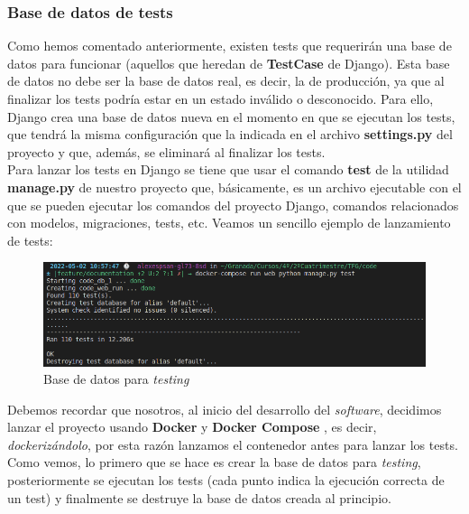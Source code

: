 \subsubsection{Base de datos de tests}
Como hemos comentado anteriormente, existen tests que requerirán una base de datos para
funcionar (aquellos que heredan de \textbf{TestCase} de Django). Esta base de datos no debe
ser la base de datos real, es decir, la de producción, ya que al finalizar los tests podría
estar en un estado inválido o desconocido. Para ello, Django crea una base de datos nueva
en el momento en que se ejecutan los tests, que tendrá la misma configuración que la
indicada en el archivo \textbf{settings.py} del proyecto y que, además, se eliminará al
finalizar los tests.\\

Para lanzar los tests en Django se tiene que usar el comando \textbf{test} de la utilidad
\textbf{manage.py} de nuestro proyecto que, básicamente, es un archivo ejecutable con el
que se pueden ejecutar los comandos del proyecto Django, comandos relacionados con modelos,
migraciones, tests, etc. Veamos un sencillo ejemplo de lanzamiento de tests:

    \begin{figure}[H]
        \centering
        \includegraphics[scale=0.40]{imagenes/db-test.png}
        \caption{Base de datos para \textit{testing}}
        \label{fig:db-test}
    \end{figure}

Debemos recordar que nosotros, al inicio del desarrollo del \textit{software}, decidimos
lanzar el proyecto usando \textbf{Docker} \cite{docker} y \textbf{Docker Compose}
\cite{docker-compose}, es decir, \textit{dockerizándolo}, por esta razón lanzamos el
contenedor antes para lanzar los tests.\\

Como vemos, lo primero que se hace es crear la base de datos para \textit{testing},
posteriormente se ejecutan los tests (cada punto indica la ejecución correcta de un test)
y finalmente se destruye la base de datos creada al principio.\\

